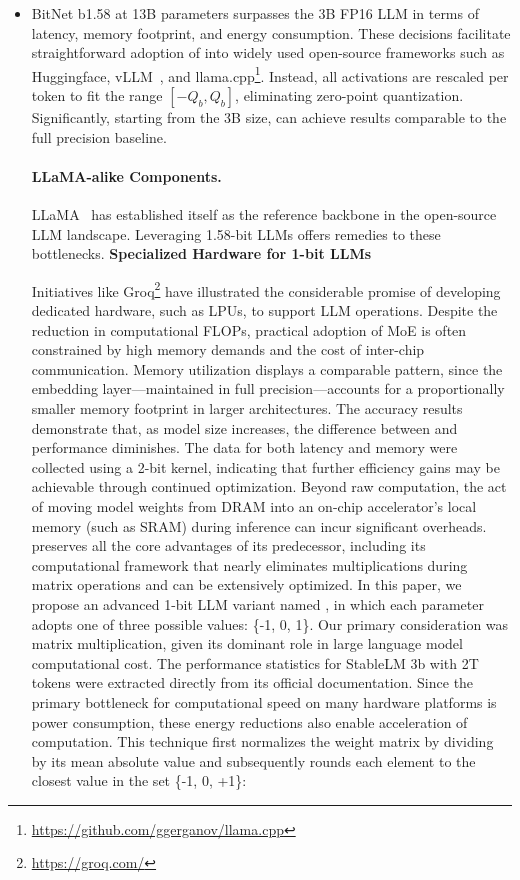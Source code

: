 \begin{itemize}
    \item BitNet b1.58 at 13B parameters surpasses the 3B FP16 LLM in terms of latency, memory footprint, and energy consumption. These decisions facilitate straightforward adoption of  into widely used open-source frameworks such as Huggingface, vLLM~\cite{vllm}, and llama.cpp\footnote{\url{https://github.com/ggerganov/llama.cpp}}. Instead, all activations are rescaled per token to fit the range $[-Q_b, Q_b]$, eliminating zero-point quantization. Significantly, starting from the 3B size,  can achieve results comparable to the full precision baseline. \paragraph{LLaMA-alike Components.}

LLaMA~\cite{llama, llama2} has established itself as the reference backbone in the open-source LLM landscape. Leveraging 1.58-bit LLMs offers remedies to these bottlenecks. \textbf{Specialized Hardware for 1-bit LLMs}

Initiatives like Groq\footnote{\url{https://groq.com/}} have illustrated the considerable promise of developing dedicated hardware, such as LPUs, to support LLM operations. Despite the reduction in computational FLOPs, practical adoption of MoE is often constrained by high memory demands and the cost of inter-chip communication. Memory utilization displays a comparable pattern, since the embedding layer—maintained in full precision—accounts for a proportionally smaller memory footprint in larger architectures. The accuracy results demonstrate that, as model size increases, the difference between  and  performance diminishes. The data for both latency and memory were collected using a 2-bit kernel, indicating that further efficiency gains may be achievable through continued optimization. Beyond raw computation, the act of moving model weights from DRAM into an on-chip accelerator’s local memory (such as SRAM) during inference can incur significant overheads.  preserves all the core advantages of its predecessor, including its computational framework that nearly eliminates multiplications during matrix operations and can be extensively optimized. In this paper, we propose an advanced 1-bit LLM variant named \textbf{}, in which each parameter adopts one of three possible values: \{-1, 0, 1\}. Our primary consideration was matrix multiplication, given its dominant role in large language model computational cost. The performance statistics for StableLM 3b with 2T tokens were extracted directly from its official documentation. Since the primary bottleneck for computational speed on many hardware platforms is power consumption, these energy reductions also enable acceleration of computation. This technique first normalizes the weight matrix by dividing by its mean absolute value and subsequently rounds each element to the closest value in the set \{-1, 0, +1\}:


\end{itemize}
